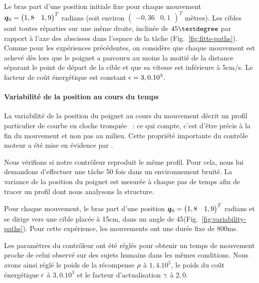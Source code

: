 \documentclass[pdftex,a4paper,11pt]{article}
\begin{document}
Le bras part d'une position initiale fixe pour chaque mouvement $\boldsymbol{q}{}_0 =
\begin{pmatrix} 1,8 & 1,9 \end{pmatrix}^T$ radians (soit environ 
$\begin{pmatrix} -0,36 & 0,1 \end{pmatrix}^T$ mètres). Les cibles sont toutes
réparties sur une même droite, inclinée de $45\textdegree$ par rapport à l'axe
des abscisses dans l'espace de la tâche (Fig.~\ref{fig:fitts-paths}).
Comme pour les expériences précédentes, on considère que chaque mouvement est
achevé dès lors que le poignet a parcouru au moins la moitié de la distance
séparant le point de départ de la cible et que sa vitesse est
inférieure à 5cm/s.
Le facteur de coût énergétique est constant $\epsilon=3,0.10^3$. 


\paragraph{Variabilité de la position au cours du temps}

La variabilité de la position du poignet au cours du mouvement décrit un profil
particulier de courbe en cloche tronquée \cite{selen2006impedance}~:
ce qui compte, c'est d'être précis à la fin du mouvement et non pas au milieu.
Cette propriété importante du contrôle moteur a été mise en évidence par
\cite{harris98_N}.

Nous vérifions si notre contrôleur reproduit le même profil.
Pour cela, nous lui demandons d'effectuer une tâche 50 fois dans un environnement bruité.
La variance de la position du poignet est mesurée à chaque pas de temps afin
de tracer un profil dont nous analysons la structure.

Pour chaque mouvement, le bras part d'une position $\boldsymbol{q}{}_0 =
\begin{pmatrix} 1,8 & 1,9 \end{pmatrix}^T$ radians et se dirige vers une cible
placée à 15cm, dans un angle de 45\textdegree (Fig.~\ref{fig:variability-paths}).
Pour cette expérience, les mouvements ont une durée fixe de 800ms.

Les paramètres du contrôleur ont été réglés pour obtenir un temps de
mouvement proche de celui observé sur des sujets humains dans les mêmes
conditions.
Nous avons ainsi réglé le poids de la récompense $\rho$ à $1,4.10^5$,
le poids du coût énergétique $\epsilon$ à $3,0.10^3$ et le facteur
d'actualisation $\gamma$ à $2,0$.
\end{document}
